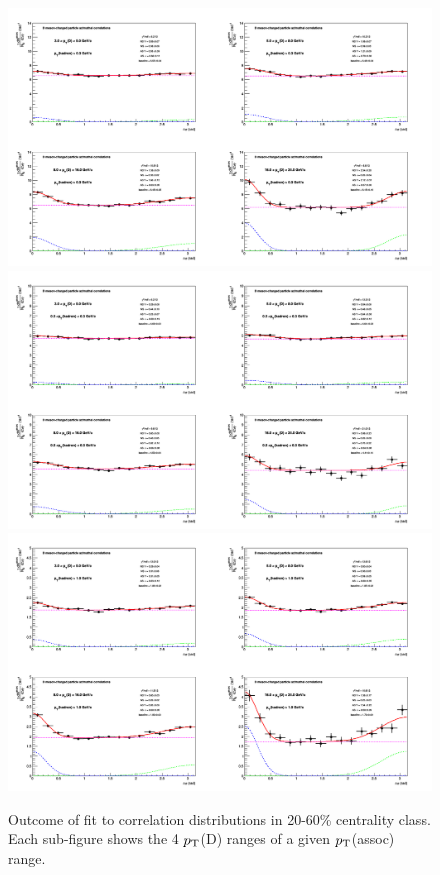 \begin{figure}
\centering
{\includegraphics[width=0.8\linewidth]{figuresVsCent/Averages/2060/cFitting_0_pthad03to99.png}}
{\includegraphics[width=0.8\linewidth]{figuresVsCent/Averages/2060/cFitting_0_pthad03to1.png}}
{\includegraphics[width=0.8\linewidth]{figuresVsCent/Averages/2060/cFitting_0_pthad1to99.png}}
 \caption{Outcome of fit to correlation distributions in 20-60\% centrality class. Each sub-figure shows the 4 $p_{\rm T}$(D) ranges of a given $p_{\rm T}$(assoc) range.}
\label{fig:fit2060}
\end{figure}

